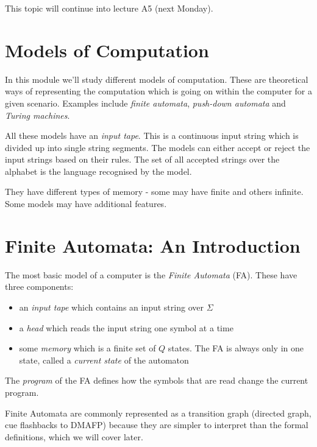 
This topic will continue into lecture A5 (next Monday).

\section{Models of Computation}
In this module we'll study different models of computation. These are theoretical ways of representing the computation which is going on within the computer for a given scenario. Examples include \textit{finite automata}, \textit{push-down automata} and \textit{Turing machines}. 

All these models have an \textit{input tape}. This is a continuous input string which is divided up into single string segments. The models can either accept or reject the input strings based on their rules. The set of all accepted strings over the alphabet is the language recognised by the model.

They have different types of memory - some may have finite and others infinite. Some models may have additional features.

\section{Finite Automata: An Introduction}
The most basic model of a computer is the \textit{Finite Automata} (FA). These have three components:
\begin{itemize}
    \item an \textit{input tape} which contains an input string over $\Sigma$
    \item a \textit{head} which reads the input string one symbol at a time
    \item some \textit{memory} which is a finite set of $Q$ states. The FA is always only in one state, called a \textit{current state} of the automaton
\end{itemize}

The \textit{program} of the FA defines how the symbols that are read change the current program.

Finite Automata are commonly represented as a transition graph (directed graph, cue flashbacks to DMAFP) because they are simpler to interpret than the formal definitions, which we will cover later.

